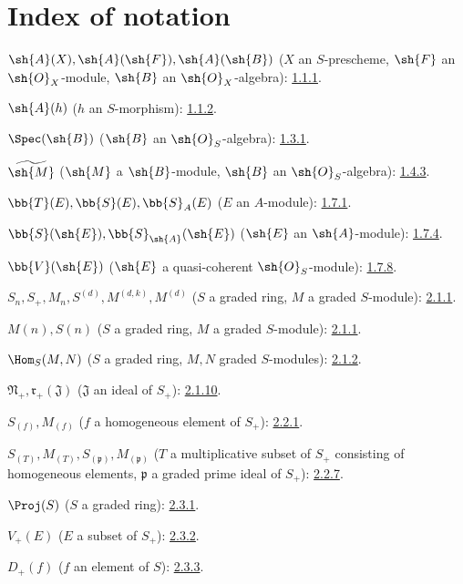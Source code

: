 \clearpage
{}
{}
\section*{Index of notation}

\begingroup
\small
\setlength{\parindent}{0pt}
\setlength{\parskip}{2pt}

$\sh{A}(X),\sh{A}(\sh{F}),\sh{A}(\sh{B})$
($X$ an $S$-prescheme, $\sh{F}$ an $\sh{O}_X$-module,
$\sh{B}$ an $\sh{O}_X$-algebra): \hyperref[II.1.1.1]{1.1.1}.

$\sh{A}(h)$ ($h$ an $S$-morphism): \hyperref[II.1.1.2]{1.1.2}.

$\Spec(\sh{B})$ ($\sh{B}$ an $\sh{O}_S$-algebra): \hyperref[II.1.3.1]{1.3.1}.

$\widetilde{\sh{M}}$ ($\sh{M}$ a $\sh{B}$-module,
$\sh{B}$ an $\sh{O}_S$-algebra): \hyperref[II.1.4.3]{1.4.3}.

$\bb{T}(E),\bb{S}(E),\bb{S}_A(E)$ ($E$ an $A$-module): \hyperref[II.1.7.1]{1.7.1}.

$\bb{S}(\sh{E}),\bb{S}_{\sh{A}}(\sh{E})$
($\sh{E}$ an $\sh{A}$-module): \hyperref[II.1.7.4]{1.7.4}.

$\bb{V}(\sh{E})$ ($\sh{E}$ a quasi-coherent $\sh{O}_S$-module): \hyperref[II.1.7.8]{1.7.8}.

$S_n,S_+,M_n,S^{(d)},M^{(d,k)},M^{(d)}$
($S$ a graded ring, $M$ a graded $S$-module): \hyperref[II.2.1.1]{2.1.1}.

$M(n),S(n)$ ($S$ a graded ring, $M$ a graded $S$-module): \hyperref[II.2.1.1]{2.1.1}.

$\Hom_S(M,N)$ ($S$ a graded ring, $M,N$ graded $S$-modules): \hyperref[II.2.1.2]{2.1.2}.

$\mathfrak N_+,\mathfrak r_+(\mathfrak J)$
($\mathfrak J$ an ideal of $S_+$): \hyperref[II.2.1.10]{2.1.10}.

$S_{(f)},M_{(f)}$ ($f$ a homogeneous element of $S_+$): \hyperref[II.2.2.1]{2.2.1}.

$S_{(T)},M_{(T)},S_{(\mathfrak p)},M_{(\mathfrak p)}$
($T$ a multiplicative subset of $S_+$ consisting of homogeneous elements,
$\mathfrak p$ a graded prime ideal of $S_+$): \hyperref[II.2.2.7]{2.2.7}.

$\Proj(S)$ ($S$ a graded ring): \hyperref[II.2.3.1]{2.3.1}.

$V_+(E)$ ($E$ a subset of $S_+$): \hyperref[II.2.3.2]{2.3.2}.

$D_+(f)$ ($f$ an element of $S$): \hyperref[II.2.3.3]{2.3.3}.

